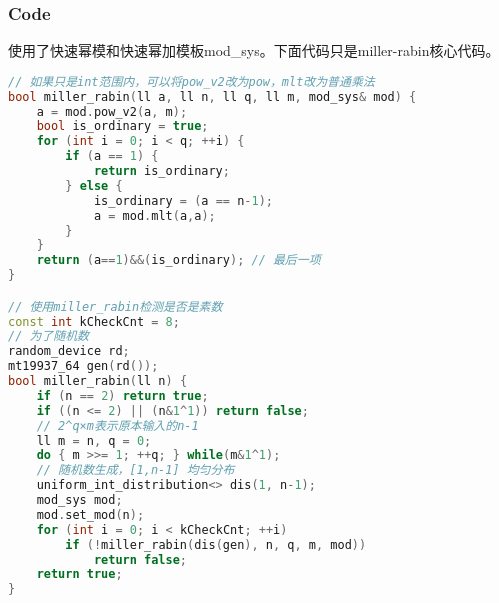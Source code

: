 \subsubsection{Code}
使用了快速幂模和快速幂加模板mod_sys。下面代码只是miller-rabin核心代码。
\begin{lstlisting}[language={c++}]
// 如果只是int范围内，可以将pow_v2改为pow，mlt改为普通乘法
bool miller_rabin(ll a, ll n, ll q, ll m, mod_sys& mod) {
    a = mod.pow_v2(a, m);
    bool is_ordinary = true;
    for (int i = 0; i < q; ++i) {
        if (a == 1) {
            return is_ordinary;
        } else {
            is_ordinary = (a == n-1);
            a = mod.mlt(a,a);
        }
    }
    return (a==1)&&(is_ordinary); // 最后一项
}

// 使用miller_rabin检测是否是素数
const int kCheckCnt = 8;
// 为了随机数
random_device rd;
mt19937_64 gen(rd());
bool miller_rabin(ll n) {
    if (n == 2) return true;
    if ((n <= 2) || (n&1^1)) return false;
    // 2^q×m表示原本输入的n-1
    ll m = n, q = 0;
    do { m >>= 1; ++q; } while(m&1^1);
    // 随机数生成，[1,n-1] 均匀分布
    uniform_int_distribution<> dis(1, n-1);
    mod_sys mod;
    mod.set_mod(n);
    for (int i = 0; i < kCheckCnt; ++i)
        if (!miller_rabin(dis(gen), n, q, m, mod))
            return false;
    return true;
}
\end{lstlisting}
